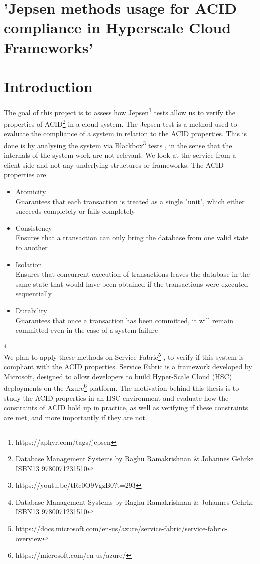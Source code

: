 \section{'Jepsen methods usage for ACID compliance in Hyperscale Cloud Frameworks'}

\section{Introduction}
The goal of this project is to assess how Jepsen\footnote[1]{https://aphyr.com/tags/jepsen } tests allow us to verify the properties of ACID\footnote[2]{Database Management Systems by Raghu Ramakrishnan \& Johannes Gehrke  ISBN13 9780071231510} in a cloud system.
The Jepsen test is a method used to evaluate the compliance of a system in relation to the ACID properties. This is done is by analysing the system via Blackbox\footnote[3]{https://youtu.be/tRc0O9VgzB0?t=293} tests , in the sense that the internals of the system work are not relevant. We look at the service from a client-side and not any underlying structures or frameworks.
The ACID properties are 
\begin{itemize}
\item	Atomicity \\
Guarantees that each transaction is treated as a single "unit", which either succeeds completely or fails completely 
\item	Consistency \\
Ensures that a transaction can only bring the database from one valid state to another
\item	Isolation \\
Ensures that concurrent execution of transactions leaves the database in the same state that would have been obtained if the transactions were executed sequentially 
\item	Durability \\
Guarantees that once a transaction has been committed, it will remain committed even in the case of a system failure 
\end{itemize}
\footnote[2]{Database Management Systems by Raghu Ramakrishnan \& Johannes Gehrke  ISBN13 9780071231510} \\
We plan to apply these methods on Service Fabric\footnote[4]{https://docs.microsoft.com/en-us/azure/service-fabric/service-fabric-overview  } , to verify if this system is compliant with the ACID properties. Service Fabric is a framework developed by Microsoft, designed to allow developers to build Hyper-Scale Cloud (HSC) deployments on the Azure\footnote[5]{https://microsoft.com/en-us/azure/ } platform.
The motivation behind this thesis is to study the ACID properties in an HSC environment and evaluate how the constraints of ACID hold up in practice, as well as verifying if these constraints are met, and more importantly if they are not. 
